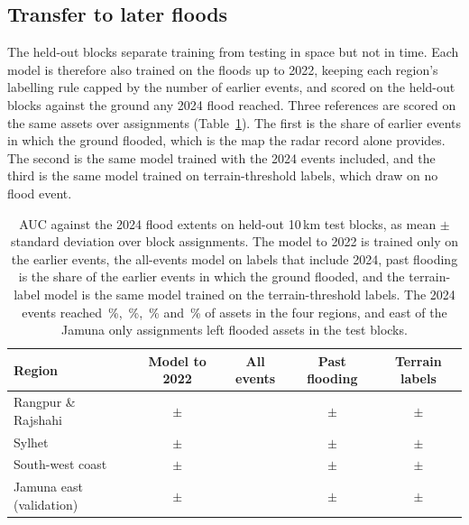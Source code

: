 \documentclass[10pt,a4paper,twocolumn]{article}
\begin{document}
\subsection{Transfer to later floods}
\label{sec:temporal}

The held-out blocks separate training from testing in space but not in time. Each model is therefore also trained on the floods up to 2022, keeping each region's labelling rule capped by the number of earlier events, and scored on the held-out blocks against the ground any 2024 flood reached. Three references are scored on the same assets over \RRTempSeeds{} assignments (Table~\ref{tab:temporal}). The first is the share of earlier events in which the ground flooded, which is the map the radar record alone provides. The second is the same model trained with the 2024 events included, and the third is the same model trained on terrain-threshold labels, which draw on no flood event.

\begin{table}[tp]
\centering
\small
\begin{tabular}{lcccc}
\toprule
Region & Model to 2022 & All events & Past flooding & Terrain labels \\
\midrule
Rangpur \& Rajshahi & \RRTempAUC{} $\pm$ \RRTempSD{} & \RRTempAllAUC{} & \RRTempPastAUC{} $\pm$ \RRTempPastSD{} & \RRTempProxyAUC{} $\pm$ \RRTempProxySD{} \\
Sylhet & \SylhetTempAUC{} $\pm$ \SylhetTempSD{} & \SylhetTempAllAUC{} & \SylhetTempPastAUC{} $\pm$ \SylhetTempPastSD{} & \SylhetTempProxyAUC{} $\pm$ \SylhetTempProxySD{} \\
South-west coast & \CoastalTempAUC{} $\pm$ \CoastalTempSD{} & \CoastalTempAllAUC{} & \CoastalTempPastAUC{} $\pm$ \CoastalTempPastSD{} & \CoastalTempProxyAUC{} $\pm$ \CoastalTempProxySD{} \\
Jamuna east (validation) & \JamunaTempAUC{} $\pm$ \JamunaTempSD{} & \JamunaTempAllAUC{} & \JamunaTempPastAUC{} $\pm$ \JamunaTempPastSD{} & \JamunaTempProxyAUC{} $\pm$ \JamunaTempProxySD{} \\
\bottomrule
\end{tabular}
\caption{AUC against the 2024 flood extents on held-out 10\,km test blocks, as mean $\pm$ standard deviation over \RRTempSeeds{} block assignments. The model to 2022 is trained only on the earlier events, the all-events model on labels that include 2024, past flooding is the share of the earlier events in which the ground flooded, and the terrain-label model is the same model trained on the terrain-threshold labels. The 2024 events reached \RRTempTestRate{}\,\%, \SylhetTempTestRate{}\,\%, \CoastalTempTestRate{}\,\% and \JamunaTempTestRate{}\,\% of assets in the four regions, and east of the Jamuna only \JamunaTempSeeds{} assignments left flooded assets in the test blocks.}
\label{tab:temporal}
\end{table}
\end{document}
